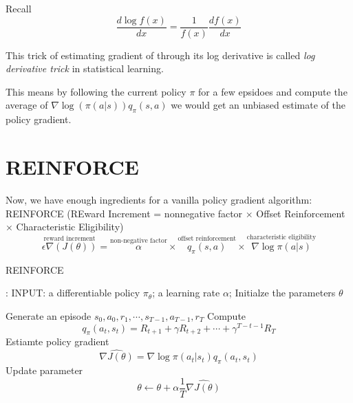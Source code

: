 \documentclass{article}
\begin{document}
Recall 
\[
  \frac{d \log f(x)}{dx} = \frac{1}{f(x)} \frac{d f(x)}{dx}
\]

This trick of estimating gradient of through its log derivative is called 
\emph{log derivative trick} in statistical learning. 

This means by following the current policy $\pi$ for a few epsidoes and compute
the average of $\nabla \log(\pi(a|s))q_{\pi}(s,a)$ we would get an unbiased 
estimate of the policy gradient. 

\section{REINFORCE}
Now, we have enough ingredients for a vanilla policy gradient algorithm: REINFORCE
(REward Increment = nonnegative factor $\times$ Offset Reinforcement $\times$ Characteristic Eligibility)
\[
  \stackrel{\text{reward increment}}{\epsilon \nabla(J(\theta))} = \stackrel{\text{non-negative factor}}
  {\alpha}\times \stackrel{\text{offset reinforcement}}{q_{\pi}(s,a)} 
  \times \stackrel{\text{characteristic eligibility}}{\nabla \log \pi(a|s)}
\]

\begin{algorithm}[H]
  \caption{REINFORCE}
\end{algorithm}
\begin{algorithmic}[1]
  \STATE: INPUT: a differentiable policy $\pi_{\theta}$;
  a learning rate $\alpha$; 
  \STATE Initialze the parameters $\theta$
  
  \REPEAT
    \STATE Generate an episode $s_0, a_0, r_1, \cdots, s_{T-1}, a_{T-1}, r_T$
    \STATE Compute 
    \[
      q_{\pi}(a_t, s_t)  = R_{t+1}+\gamma R_{t+2} + \cdots + 
        \gamma^{T-t-1}R_T
    \]
    \STATE Estiamte policy gradient
    \[
      \hat {\nabla J(\theta)} = \nabla \log \pi(a_t|s_t)q_{\pi}(a_t, s_t)
    \]
    \STATE Update parameter
    \[
      \theta \leftarrow \theta + \alpha\frac{1}{T}\hat{\nabla J(\theta)}
    \]
    \ENDFOR
\end{algorithmic}

      

    
\end{document}
